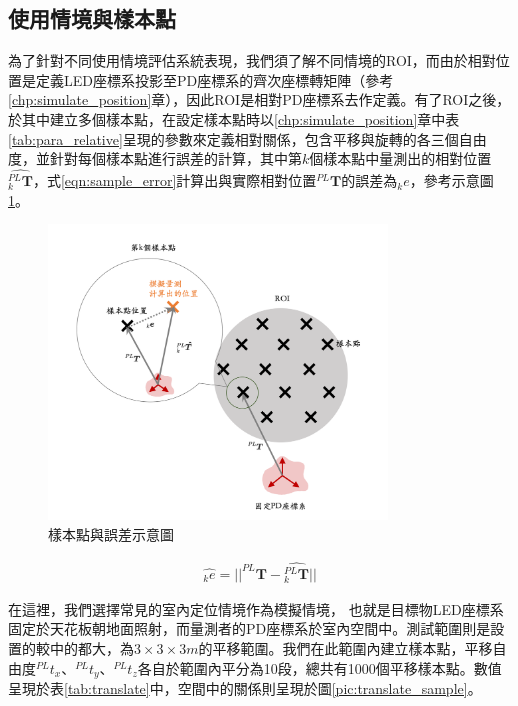 \subsection{使用情境與樣本點}
\label{chp:scenario}




為了針對不同使用情境評估系統表現，我們須了解不同情境的ROI，而由於相對位置是定義LED座標系投影至PD座標系的齊次座標轉矩陣（參考\ref{chp:simulate_position}章），因此ROI是相對PD座標系去作定義。有了ROI之後，於其中建立多個樣本點，在設定樣本點時以\ref{chp:simulate_position}章中表\ref{tab:para_relative}呈現的參數來定義相對關係，包含平移與旋轉的各三個自由度，並針對每個樣本點進行誤差的計算，其中第$k$個樣本點中量測出的相對位置$\hat{^{PL}_{k}\boldsymbol{T}}$，式\ref{eqn:sample_error}計算出與實際相對位置$^{PL}\boldsymbol{T}$的誤差為$_k e$，參考示意圖\ref{pic:error_show}。

\begin{figure}[ht]
    \centering
    \includegraphics[width=9cm]{ch4pic/error.png}
    \caption{樣本點與誤差示意圖}
    \label{pic:error_show}
\end{figure}

\begin{gather}
    \label{eqn:sample_error}
    \hat{_k e} = ||^{PL}\boldsymbol{T}-\hat{^{PL}_k\boldsymbol{T}}||
\end{gather}


在這裡，我們選擇常見的室內定位情境作為模擬情境，
也就是目標物LED座標系固定於天花板朝地面照射，而量測者的PD座標系於室內空間中。測試範圍則是設置的較\cite{case:cart3d}\cite{case:3d_layers}中的都大，為$3 \times 3 \times 3 m$的平移範圍。我們在此範圍內建立樣本點，平移自由度$^{PL}t_x$、$^{PL}t_y$、$^{PL}t_z$各自於範圍內平分為10段，總共有1000個平移樣本點。數值呈現於表\ref{tab:translate}中，空間中的關係則呈現於圖\ref{pic:translate_sample}。

